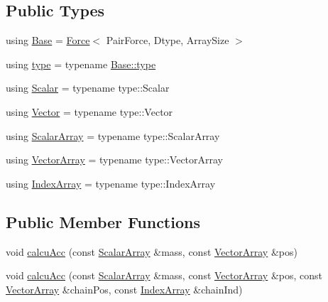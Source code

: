\subsection*{Public Types}
\begin{DoxyCompactItemize}
\item 
using \mbox{\hyperlink{struct_space_h_1_1_vel_indep_force_a701c4046691703996abfd8d231a0caac}{Base}} = \mbox{\hyperlink{struct_space_h_1_1_force}{Force}}$<$ Pair\+Force, Dtype, Array\+Size $>$
\item 
using \mbox{\hyperlink{struct_space_h_1_1_vel_indep_force_a01b848e02573e4aa9580cec647efda9c}{type}} = typename \mbox{\hyperlink{struct_space_h_1_1_force_a151c6ae1ec7ad87825c2b6cc74aee5f2}{Base\+::type}}
\item 
using \mbox{\hyperlink{struct_space_h_1_1_vel_indep_force_acd8813e87e53d01f1c824fcac58b7c1e}{Scalar}} = typename type\+::\+Scalar
\item 
using \mbox{\hyperlink{struct_space_h_1_1_vel_indep_force_abc12ce8c91664111b8d37b9d439c7b89}{Vector}} = typename type\+::\+Vector
\item 
using \mbox{\hyperlink{struct_space_h_1_1_vel_indep_force_a05d04af454b5217024f5fff45d7e4d32}{Scalar\+Array}} = typename type\+::\+Scalar\+Array
\item 
using \mbox{\hyperlink{struct_space_h_1_1_vel_indep_force_a6b4e8ca988b015e7f956f015991ecd80}{Vector\+Array}} = typename type\+::\+Vector\+Array
\item 
using \mbox{\hyperlink{struct_space_h_1_1_vel_indep_force_ac8dcda8c288da58df2f706259eeae0a9}{Index\+Array}} = typename type\+::\+Index\+Array
\end{DoxyCompactItemize}
\subsection*{Public Member Functions}
\begin{DoxyCompactItemize}
\item 
void \mbox{\hyperlink{struct_space_h_1_1_vel_indep_force_a38036f5de71884159cbb513883379ae9}{calcu\+Acc}} (const \mbox{\hyperlink{struct_space_h_1_1_vel_indep_force_a05d04af454b5217024f5fff45d7e4d32}{Scalar\+Array}} \&mass, const \mbox{\hyperlink{struct_space_h_1_1_vel_indep_force_a6b4e8ca988b015e7f956f015991ecd80}{Vector\+Array}} \&pos)
\item 
void \mbox{\hyperlink{struct_space_h_1_1_vel_indep_force_a82661f96988b6dfa6e7b13db4906cd57}{calcu\+Acc}} (const \mbox{\hyperlink{struct_space_h_1_1_vel_indep_force_a05d04af454b5217024f5fff45d7e4d32}{Scalar\+Array}} \&mass, const \mbox{\hyperlink{struct_space_h_1_1_vel_indep_force_a6b4e8ca988b015e7f956f015991ecd80}{Vector\+Array}} \&pos, const \mbox{\hyperlink{struct_space_h_1_1_vel_indep_force_a6b4e8ca988b015e7f956f015991ecd80}{Vector\+Array}} \&chain\+Pos, const \mbox{\hyperlink{struct_space_h_1_1_vel_indep_force_ac8dcda8c288da58df2f706259eeae0a9}{Index\+Array}} \&chain\+Ind)
\end{DoxyCompactItemize}
